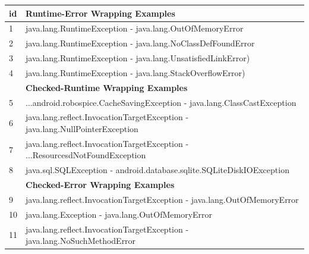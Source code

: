 \documentclass[conference]{IEEEtran}
\begin{document}



\begin{table}
\centering

\begin{tabular}{ll}
    \hline
 id & \bfseries{Runtime-Error Wrapping Examples}    \\  %
    \hline
1 & java.lang.RuntimeException - java.lang.OutOfMemoryError  \\ %
2 &java.lang.RuntimeException - java.lang.NoClassDefFoundError \\ %
3 &java.lang.RuntimeException - java.lang.UnsatisfiedLinkError)  \\ %
4& java.lang.RuntimeException -  java.lang.StackOverflowError)   \\ %
\hline
 & \bfseries{Checked-Runtime Wrapping Examples}   \\
 \hline
5& ...android.robospice.CacheSavingException - java.lang.ClassCastException   \\ %
6&java.lang.reflect.InvocationTargetException - java.lang.NullPointerException    \\ %
7&java.lang.reflect.InvocationTargetException - ...ResourcesdNotFoundException  \\ %
8&java.sql.SQLException - android.database.sqlite.SQLiteDiskIOException   \\ %
 \hline
& \bfseries{Checked-Error Wrapping Examples}  \\
 \hline
9&java.lang.reflect.InvocationTargetException - java.lang.OutOfMemoryError  \\ %
10&java.lang.Exception - java.lang.OutOfMemoryError   \\ %
11&java.lang.reflect.InvocationTargetException - java.lang.NoSuchMethodError 	 \\ %

\end{tabular}
\end{table}
\end{document}
